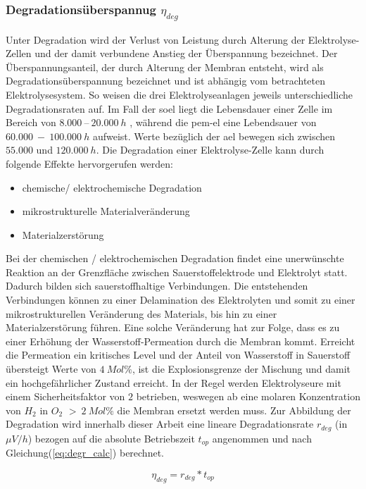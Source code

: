 \documentclass[onecolumn,10pt,titlepage]{article}
\begin{document}
			\subsubsection*{Degradationsüberspannug $\eta_{deg}$}
			Unter Degradation wird der Verlust von Leistung durch Alterung der Elektrolyse-Zellen und der damit verbundene Anstieg der Überspannung bezeichnet. Der Überspannungsanteil, der durch Alterung der Membran entsteht, wird als Degradationsüberspannung bezeichnet und ist abhängig vom betrachteten Elektrolysesystem. So weisen die drei Elektrolyseanlagen jeweils unterschiedliche Degradationsraten auf. Im Fall der \gls{soel} liegt die Lebensdauer einer Zelle im Bereich von $8.000 ~– ~20.000~h$ \cite{DeNiangThe.12.2015}, während die \gls{pem}-\gls{el} eine Lebendsauer von $60.000~ - ~100.000~h$ aufweist. Werte bezüglich der \gls{ael} bewegen sich zwischen $55.000$ und $120.000~h$.\cite{Buttler.2018} Die Degradation einer Elektrolyse-Zelle kann durch folgende Effekte hervorgerufen werden:
			\begin{itemize}
				\item chemische/ elektrochemische Degradation
				\item mikrostrukturelle Materialveränderung
				\item Materialzerstörung
			\end{itemize}
			Bei der chemischen / elektrochemischen Degradation findet eine unerwünschte Reaktion an der Grenzfläche zwischen Sauerstoffelektrode und Elektrolyt statt. Dadurch bilden sich sauerstoffhaltige Verbindungen. Die entstehenden Verbindungen können zu einer Delamination des Elektrolyten und somit zu einer mikrostrukturellen Veränderung des Materials, bis hin zu einer Materialzerstörung führen. Eine solche Veränderung hat zur Folge, dass es zu einer Erhöhung der Wasserstoff-Permeation durch die Membran kommt. Erreicht die Permeation ein kritisches Level und der Anteil von Wasserstoff in Sauerstoff übersteigt Werte von $4 ~Mol\%$, ist die Explosionsgrenze der Mischung und damit ein hochgefährlicher Zustand erreicht. In der Regel werden Elektrolyseure mit einem Sicherheitsfaktor von $2$ betrieben, weswegen ab eine molaren Konzentration von $H_2$ in $O_2$ $>~2~Mol\%$ die Membran ersetzt werden muss.\cite{Trinke2018}
			Zur Abbildung der Degradation wird innerhalb dieser Arbeit eine lineare Degradationsrate $r_{deg}$ (in $\mu V/h$) bezogen auf die absolute Betriebszeit $t_{op}$ angenommen und nach Gleichung(\ref{eq:degr_calc}) berechnet.

			\begin{equation}
				\eta_{deg} = r_{deg} * t_{op}
				\label{eq:degr_calc}
			\end{equation}
\end{document}
